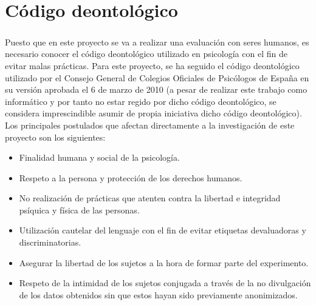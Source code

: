 \section{Código deontológico}
\subparagraph{}
Puesto que en este proyecto se va a realizar una evaluación con seres humanos, es necesario conocer el código deontológico utilizado en psicología con el fin de evitar malas prácticas. Para este proyecto, se ha seguido el código deontológico utilizado por el Consejo General de Colegios Oficiales de Psicólogos de España en su versión aprobada el 6 de marzo de 2010 (a pesar de realizar este trabajo como informático y por tanto no estar regido por dicho código deontológico, se considera imprescindible asumir de propia iniciativa dicho código deontológico). Los principales postulados que afectan directamente a la investigación de este proyecto son los siguientes:
\begin{itemize}
    \item Finalidad humana y social de la psicología.
    \item Respeto a la persona y protección de los derechos humanos.
    \item No realización de prácticas que atenten contra la libertad e integridad psíquica y física de las personas.
    \item Utilización cautelar del lenguaje con el fin de evitar etiquetas devaluadoras y discriminatorias.
    \item Asegurar la libertad de los sujetos a la hora de formar parte del experimento.
    \item Respeto de la intimidad de los sujetos conjugada a través de la no divulgación de los datos obtenidos sin que estos hayan sido previamente anonimizados.
\end{itemize}